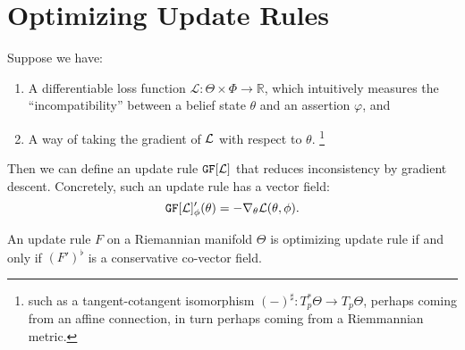 \documentclass{article}
\begin{document}
\section{Optimizing Update Rules}
Suppose we have:
\begin{enumerate}[nosep]
    \item A differentiable loss function $\mathcal L : \Theta \times \Phi  \to \mathbb R$, which intuitively measures the ``incompatibility'' between a belief state $\theta$ and an assertion $\varphi$, and
    \item
        A way of taking the gradient of ${\cal L}$ with respect to $\theta$.%
            \footnote{
            such as a tangent-cotangent isomorphism $(-)^\sharp : T^*_p\Theta \to T_p \Theta$, perhaps coming from an affine connection, in turn perhaps coming from a Riemmannian metric.}
\end{enumerate}
\def\GD#1{\mathtt{GF}[#1]}
\def\NGD#1{\mathtt{NGF}[#1]}

Then we can define an update rule $\GD {\cal L}$ that reduces inconsistency by gradient descent. Concretely, such an update rule has a vector field:
\[
    \GD {\cal L}'_\phi(\theta) = - \nabla_\theta {\cal L}(\theta,\phi).
\]


\begin{prop}
    An update rule $F$ on a Riemannian manifold $\Theta$ is optimizing update rule if and only if $(F')^\flat$ is a conservative co-vector field.
    \cite[Prop 11.40]{lee2013smooth}
\end{prop}
\end{document}

